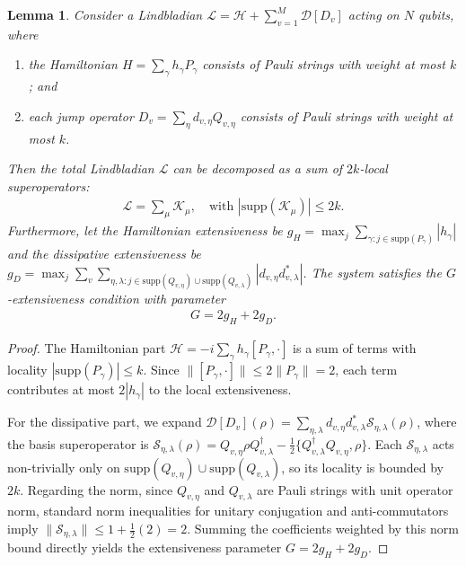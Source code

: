 \documentclass[aps,pra,reprint,groupedaddress,floatfix]{revtex4-2}
\newtheorem{lemma}{Lemma}
\newcommand{\supp}{\mathrm{supp}}
\begin{document}
\begin{lemma}
\label{lem:lindblad-mapping}
    Consider a Lindbladian $\mathcal{L} = \mathcal{H} + \sum_{v=1}^M \mathcal{D}[D_v]$ acting on $N$ qubits, where
    \begin{enumerate}
        \item the Hamiltonian $H = \sum_{\gamma} h_\gamma P_\gamma$ consists of Pauli strings with weight at most $k$; and 
        \item each jump operator $D_v = \sum_{\eta} d_{v,\eta} Q_{v,\eta}$ consists of Pauli strings with weight at most $k$.
    \end{enumerate}
    Then the total Lindbladian $\mathcal{L}$ can be decomposed as a sum of \emph{$2k$-local superoperators}:
    \begin{align*}
        \mathcal{L} = \sum_{\mu} \mathcal{K}_\mu, \quad \text{with } |\supp(\mathcal{K}_\mu)| \le 2k.
    \end{align*}
    Furthermore, let the Hamiltonian extensiveness be $g_H = \max_j \sum_{\gamma: j \in \supp(P_\gamma)} |h_\gamma|$ and the dissipative extensiveness be $g_D = \max_j \sum_{v} \sum_{\eta, \lambda: j \in \supp(Q_{v,\eta}) \cup \supp(Q_{v,\lambda})} |d_{v,\eta} d_{v,\lambda}^*|$.
    The system satisfies the \emph{$G$-extensiveness} condition with parameter
    \begin{align*}
        G = 2 g_H + 2 g_D.
    \end{align*}
\end{lemma}
\begin{proof}
    The Hamiltonian part $\mathcal{H} = -i \sum_\gamma h_\gamma [P_\gamma, \cdot]$ is a sum of terms with locality $|\supp(P_\gamma)| \le k$. Since $\|[P_\gamma, \cdot]\| \le 2\|P_\gamma\| = 2$, each term contributes at most $2|h_\gamma|$ to the local extensiveness.
    
    For the dissipative part, we expand $\mathcal{D}[D_v](\rho) = \sum_{\eta,\lambda} d_{v,\eta}d_{v,\lambda}^* \mathcal{S}_{\eta,\lambda}(\rho)$, where the basis superoperator is $\mathcal{S}_{\eta,\lambda}(\rho) = Q_{v,\eta}\rho Q_{v,\lambda}^\dagger - \frac{1}{2}\{Q_{v,\lambda}^\dagger Q_{v,\eta}, \rho\}$. 
    Each $\mathcal{S}_{\eta,\lambda}$ acts non-trivially only on $\supp(Q_{v,\eta}) \cup \supp(Q_{v,\lambda})$, so its locality is bounded by $2k$.
    Regarding the norm, since $Q_{v,\eta}$ and $Q_{v,\lambda}$ are Pauli strings with unit operator norm, standard norm inequalities for unitary conjugation and anti-commutators imply $\|\mathcal{S}_{\eta,\lambda}\|\le 1 + \frac{1}{2}(2) = 2$.
    Summing the coefficients weighted by this norm bound directly yields the extensiveness parameter $G = 2g_H + 2g_D$.
\end{proof}
\end{document}
